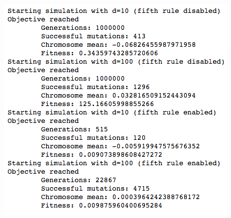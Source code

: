 \documentclass[10pt,letterpaper]{article}
\begin{document}
\begin{enumerate}
        \begin{center}
            \includegraphics[scale=.6]{./assets/ex-2.png}
        \end{center}
\end{enumerate}
\end{document}
